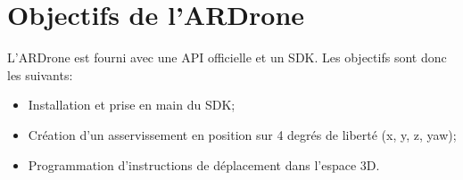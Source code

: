 	\section{Objectifs de l'ARDrone}
	\label{sec:objectifs_ardrone}
		L'ARDrone est fourni avec une API officielle et un SDK\@. Les objectifs sont donc les suivants: \\
		\begin{itemize}
			\item Installation et prise en main du SDK\@;
			\item Création d'un asservissement en position sur 4 degrés de liberté (x, y, z, yaw);
			\item Programmation d'instructions de déplacement dans l'espace 3D\@.
		\end{itemize}
